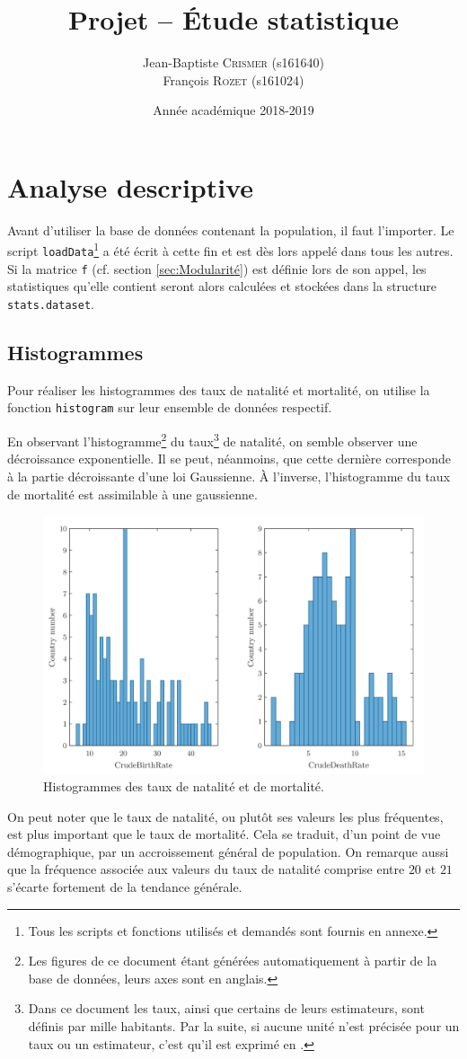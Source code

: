 \documentclass[a4paper, 12pt]{article}
\title{Projet -- Étude statistique}
\author{Jean-Baptiste \textsc{Crismer} (s161640)\\François \textsc{Rozet} (s161024)\\}
\date{Année académique 2018-2019}
\def\ptsd{\textperthousand}
\begin{document}
	
	\section{Analyse descriptive} \label{sec:Q1}
    Avant d'utiliser la base de données contenant la population, il faut l'importer. Le script \texttt{loadData}\footnote{Tous les scripts et fonctions utilisés et demandés sont fournis en annexe.} a été écrit à cette fin et est dès lors appelé dans tous les autres. Si la matrice \texttt{f} (cf. section \ref{sec:Modularité}) est définie lors de son appel, les statistiques qu'elle contient seront alors calculées et stockées dans la structure \texttt{stats.dataset}.
	\subsection{Histogrammes} \label{sec:Q1a}
	Pour réaliser les histogrammes des taux de natalité et mortalité, on utilise la fonction \texttt{histogram} sur leur ensemble de données respectif. \par
	En observant l'histogramme\footnote{Les figures de ce document étant générées automatiquement à partir de la base de données, leurs axes sont en anglais.} du taux\footnote{Dans ce document les taux, ainsi que certains de leurs estimateurs, sont définis par mille habitants. Par la suite, si aucune unité n'est précisée pour un taux ou un estimateur, c'est qu'il est exprimé en \ptsd.} de natalité, on semble observer une décroissance exponentielle. Il se peut, néanmoins, que cette dernière corresponde à la partie décroissante d'une loi Gaussienne. À l'inverse, l'histogramme du taux de mortalité est assimilable à une gaussienne. \par
	\begin{figure}[h]
		\centering
		\includegraphics[scale=0.24]{resources/pdf/q1a.pdf}
		\caption{Histogrammes des taux de natalité et de mortalité.}
		\label{figure:Q1a}
	\end{figure}
	On peut noter que le taux de natalité, ou plutôt ses valeurs les plus fréquentes, est plus important que le taux de mortalité. Cela se traduit, d'un point de vue démographique, par un accroissement général de population. On remarque aussi que la fréquence associée aux valeurs du taux de natalité comprise entre $20$ et $21$ s'écarte fortement de la tendance générale.
\end{document}
